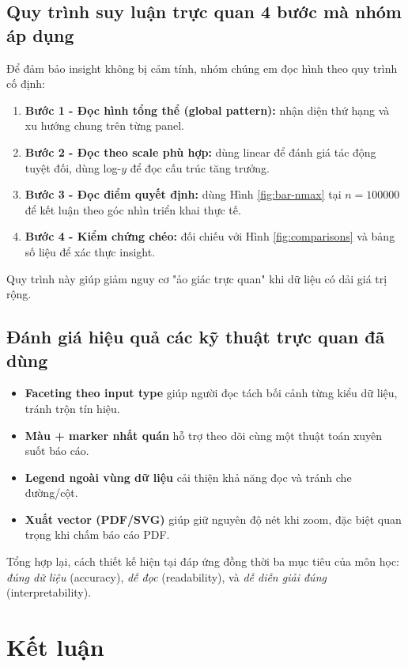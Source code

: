\subsection{Quy trình suy luận trực quan 4 bước mà nhóm áp dụng}

Để đảm bảo insight không bị cảm tính, nhóm chúng em đọc hình theo quy trình cố định:
\begin{enumerate}[leftmargin=1.2cm]
    \item \textbf{Bước 1 - Đọc hình tổng thể (global pattern):} nhận diện thứ hạng và xu hướng chung trên từng panel.
    \item \textbf{Bước 2 - Đọc theo scale phù hợp:} dùng linear để đánh giá tác động tuyệt đối, dùng log-$y$ để đọc cấu trúc tăng trưởng.
    \item \textbf{Bước 3 - Đọc điểm quyết định:} dùng Hình \ref{fig:bar-nmax} tại $n=100000$ để kết luận theo góc nhìn triển khai thực tế.
    \item \textbf{Bước 4 - Kiểm chứng chéo:} đối chiếu với Hình \ref{fig:comparisons} và bảng số liệu để xác thực insight.
\end{enumerate}

Quy trình này giúp giảm nguy cơ "ảo giác trực quan" khi dữ liệu có dải giá trị rộng.

\subsection{Đánh giá hiệu quả các kỹ thuật trực quan đã dùng}

\begin{itemize}[leftmargin=1.2cm]
    \item \textbf{Faceting theo input type} giúp người đọc tách bối cảnh từng kiểu dữ liệu, tránh trộn tín hiệu.
    \item \textbf{Màu + marker nhất quán} hỗ trợ theo dõi cùng một thuật toán xuyên suốt báo cáo.
    \item \textbf{Legend ngoài vùng dữ liệu} cải thiện khả năng đọc và tránh che đường/cột.
    \item \textbf{Xuất vector (PDF/SVG)} giúp giữ nguyên độ nét khi zoom, đặc biệt quan trọng khi chấm báo cáo PDF.
\end{itemize}

Tổng hợp lại, cách thiết kế hiện tại đáp ứng đồng thời ba mục tiêu của môn học:
\textit{đúng dữ liệu} (accuracy), \textit{dễ đọc} (readability), và \textit{dễ diễn giải đúng} (interpretability).

\section{Kết luận}

